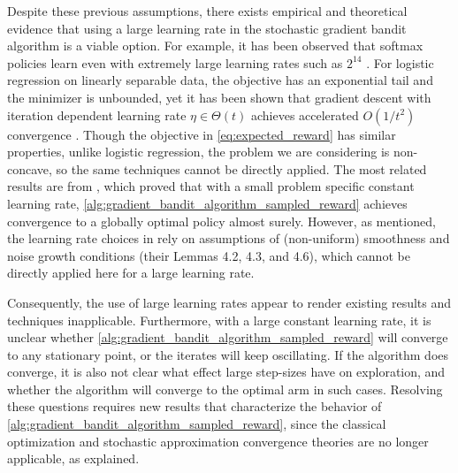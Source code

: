 Despite these previous assumptions, there exists empirical and theoretical evidence that using a large learning rate in the stochastic gradient bandit algorithm is a viable option. For example, it has been observed that softmax policies learn even with extremely large learning rates such as $2^{14}$ \citep{garg2021alternate}. For logistic regression on linearly separable data, the objective has an exponential tail and the minimizer is unbounded, yet it has been shown that gradient descent with iteration dependent learning rate $\eta \in \Theta(t)$ achieves accelerated $O(1/t^2)$ convergence \citep{wu2024large}. Though the objective in \cref{eq:expected_reward} has similar properties, unlike logistic regression, the problem we are considering is non-concave, so the same techniques cannot be directly applied. %
The most related results are from \citep{mei2024stochastic}, which proved that with a small problem specific constant learning rate, \cref{alg:gradient_bandit_algorithm_sampled_reward} achieves convergence to a globally optimal policy almost surely. However, as mentioned, the learning rate choices in \citep{mei2024stochastic} rely on assumptions of (non-uniform) smoothness and noise growth conditions (their Lemmas 4.2, 4.3, and 4.6), which cannot be directly applied here for a large learning rate.

Consequently, the use of large learning rates appear to render existing results and techniques inapplicable. Furthermore, with a large constant learning rate, it is unclear whether \cref{alg:gradient_bandit_algorithm_sampled_reward} will converge to any stationary point, or the iterates will keep oscillating. If the algorithm does converge, it is also not clear what effect large step-sizes have on exploration, and whether the algorithm will converge to the optimal arm in such cases. Resolving these questions requires new results that characterize the behavior of \cref{alg:gradient_bandit_algorithm_sampled_reward}, since the classical optimization and stochastic approximation convergence theories are no longer applicable, as explained. %



